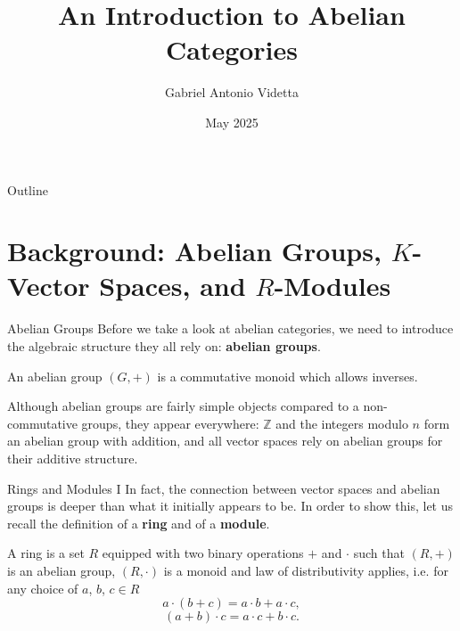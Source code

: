 \documentclass{beamer}
\title{An Introduction to Abelian Categories}
\author{Gabriel Antonio Videtta\texorpdfstring{\vspace*{-13pt}}{}}
\date{May 2025}
\newcommand{\ZZ}{\mathbb{Z}}
\begin{document}
\begin{frame}
    \titlepage
\end{frame}


\begin{frame}{Outline}
    \tableofcontents
\end{frame}



\section{Background: Abelian Groups, \texorpdfstring{$K$}{K}-Vector Spaces, and \texorpdfstring{$R$}{R}-Modules}

\begin{frame}{Abelian Groups}
    Before we take a look at abelian categories, we
    need to introduce the algebraic structure they
    all rely on: \textbf{abelian groups}. \medskip

    \begin{definition}
        An abelian group $(G, +)$ is a commutative monoid
        which allows inverses.
    \end{definition}

    Although abelian groups are fairly simple objects compared to
    a non-commutative groups, they
    appear everywhere: $\ZZ$ and the integers modulo $n$ form
    an abelian group with addition, and all vector spaces rely on
    abelian groups for their additive structure.
\end{frame}

\begin{frame}{Rings and Modules I}
    In fact, the connection between vector spaces and abelian groups is
    deeper than what it initially appears to be. In order to show this,
    let us recall the definition of a \textbf{ring} and of a \textbf{module}.

    \begin{definition}[Ring]
        A ring is a set $R$ equipped with two binary operations $+$ and $\cdot$
        such that $(R, +)$ is an abelian
        group, $(R, \cdot)$ is a monoid and law of distributivity applies, i.e.
        for any choice of $a$, $b$, $c \in R$
        \[
            a \cdot (b + c) = a \cdot b + a \cdot c,
        \]
        \[
            (a + b) \cdot c = a \cdot c + b \cdot c.
        \]
    \end{definition}
\end{frame}
\end{document}
